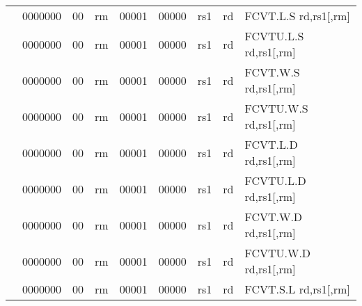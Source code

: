 \begin{table}[p]
\begin{small}
\begin{center}
\begin{tabular}{rcccccccccl}
&
\multicolumn{1}{|c|}{0000000} &
\multicolumn{1}{c|}{00} &
\multicolumn{2}{c|}{rm} &
\multicolumn{2}{c|}{00001} &
\multicolumn{1}{c|}{00000} &
\multicolumn{1}{c|}{rs1} &
\multicolumn{1}{c|}{rd} & FCVT.L.S rd,rs1[,rm] \\
\cline{2-10}
  

&
\multicolumn{1}{|c|}{0000000} &
\multicolumn{1}{c|}{00} &
\multicolumn{2}{c|}{rm} &
\multicolumn{2}{c|}{00001} &
\multicolumn{1}{c|}{00000} &
\multicolumn{1}{c|}{rs1} &
\multicolumn{1}{c|}{rd} & FCVTU.L.S rd,rs1[,rm] \\
\cline{2-10}
  

&
\multicolumn{1}{|c|}{0000000} &
\multicolumn{1}{c|}{00} &
\multicolumn{2}{c|}{rm} &
\multicolumn{2}{c|}{00001} &
\multicolumn{1}{c|}{00000} &
\multicolumn{1}{c|}{rs1} &
\multicolumn{1}{c|}{rd} & FCVT.W.S rd,rs1[,rm] \\
\cline{2-10}
  

&
\multicolumn{1}{|c|}{0000000} &
\multicolumn{1}{c|}{00} &
\multicolumn{2}{c|}{rm} &
\multicolumn{2}{c|}{00001} &
\multicolumn{1}{c|}{00000} &
\multicolumn{1}{c|}{rs1} &
\multicolumn{1}{c|}{rd} & FCVTU.W.S rd,rs1[,rm] \\
\cline{2-10}
  

&
\multicolumn{1}{|c|}{0000000} &
\multicolumn{1}{c|}{00} &
\multicolumn{2}{c|}{rm} &
\multicolumn{2}{c|}{00001} &
\multicolumn{1}{c|}{00000} &
\multicolumn{1}{c|}{rs1} &
\multicolumn{1}{c|}{rd} & FCVT.L.D rd,rs1[,rm] \\
\cline{2-10}
  

&
\multicolumn{1}{|c|}{0000000} &
\multicolumn{1}{c|}{00} &
\multicolumn{2}{c|}{rm} &
\multicolumn{2}{c|}{00001} &
\multicolumn{1}{c|}{00000} &
\multicolumn{1}{c|}{rs1} &
\multicolumn{1}{c|}{rd} & FCVTU.L.D rd,rs1[,rm] \\
\cline{2-10}
  

&
\multicolumn{1}{|c|}{0000000} &
\multicolumn{1}{c|}{00} &
\multicolumn{2}{c|}{rm} &
\multicolumn{2}{c|}{00001} &
\multicolumn{1}{c|}{00000} &
\multicolumn{1}{c|}{rs1} &
\multicolumn{1}{c|}{rd} & FCVT.W.D rd,rs1[,rm] \\
\cline{2-10}
  

&
\multicolumn{1}{|c|}{0000000} &
\multicolumn{1}{c|}{00} &
\multicolumn{2}{c|}{rm} &
\multicolumn{2}{c|}{00001} &
\multicolumn{1}{c|}{00000} &
\multicolumn{1}{c|}{rs1} &
\multicolumn{1}{c|}{rd} & FCVTU.W.D rd,rs1[,rm] \\
\cline{2-10}
  

&
\multicolumn{1}{|c|}{0000000} &
\multicolumn{1}{c|}{00} &
\multicolumn{2}{c|}{rm} &
\multicolumn{2}{c|}{00001} &
\multicolumn{1}{c|}{00000} &
\multicolumn{1}{c|}{rs1} &
\multicolumn{1}{c|}{rd} & FCVT.S.L rd,rs1[,rm] \\
\cline{2-10}
  


\end{tabular}
\end{center}
\end{small}
\end{table}
